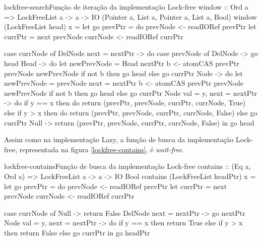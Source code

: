 \documentclass[a4paper,12pt,oldfontcommands]{abntex2}
\begin{document}
\begin{code}{lockfree-search}{Função de iteração da implementação Lock-free}
window :: Ord a => LockFreeList a -> a -> IO (Pointer a, List a, Pointer a, List a, Bool)
window (LockFreeList head) x =
    let
        go prevPtr = do
            prevNode <- readIORef prevPtr
            let currPtr = next prevNode
            currNode <- readIORef currPtr

            case currNode of
                DelNode { next = nextPtr } -> do
                    case prevNode of
                        DelNode {} -> go head
                        Head {} -> do
                            let newPrevNode = Head nextPtr
                            b <- atomCAS prevPtr prevNode newPrevNode
                            if not b then go head
                            else go currPtr
                        Node {} -> do
                            let newPrevNode = prevNode { next = nextPtr }
                            b <- atomCAS prevPtr prevNode newPrevNode
                            if not b then go head
                            else go currPtr
                Node { val = y, next = nextPtr } -> do
                    if y == x then do
                        return (prevPtr, prevNode, currPtr, currNode, True)
                    else if y > x then do
                        return (prevPtr, prevNode, currPtr, currNode, False)
                    else go currPtr
                Null -> return (prevPtr, prevNode, currPtr, currNode, False)
    in go head
\end{code}

Assim como na implementação Lazy, a função de busca da implementação Lock-free, representada na figura \ref{lockfree-contains}, é \textit{wait-free}.

\begin{code}{lockfree-contains}{Função de busca da implementação Lock-free}
contains :: (Eq a, Ord a) => LockFreeList a -> a -> IO Bool
contains (LockFreeList headPtr) x =
    let
        go prevPtr = do
            prevNode <- readIORef prevPtr
            let currPtr = next prevNode
            currNode <- readIORef currPtr

            case currNode of
                Null -> return False
                DelNode { next = nextPtr } -> go nextPtr
                Node { val = y, next = nextPtr } -> do
                    if y == x then return True
                    else if y > x then return False
                    else go currPtr
    in go headPtr
\end{code}
\end{document}
